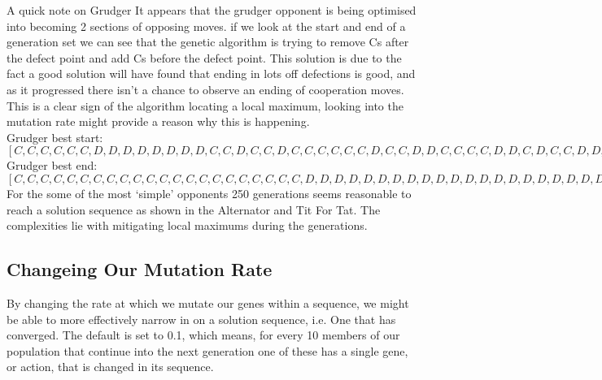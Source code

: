     A quick note on Grudger It appears that the grudger opponent is being optimised into becoming 2 sections of opposing moves. if we look at the start and end of a generation set we can see that the genetic algorithm is trying to remove Cs after the defect point and add Cs before the defect point. This solution is due to the fact a good solution will have found that ending in lots off defections is good, and as it progressed there isn't a chance to observe an ending of cooperation moves. This is a clear sign of the algorithm locating a local maximum, looking into the mutation rate might provide a reason why this is happening.\\
    
    Grudger best start:\([C, C, C, C, C, C, D, D, D, D, D, D, D, D, C, C, D, C, C, D, C, C, C, C, C, C, D, C, C, D, D, C, C, C, C, D, D, C, D, C, C, D, D, D, D, D, D, D, D, D, D, C, D, C, D, D, D, C, D, D, D, C, D, C, D, C, C, D, D, C, D, C, D, D, C, C, C, D, D, D, D, D, C, C, D, D, C, C, D, C, D, D, C, D, C, C, C, C, D, C, C, D, C, D, C, C, D, D, D, C, D, C, C, D, D, C, D, D, D, D, D, D, D, C, C, C, D, D, C, D, D, C, C, C, D, C, D, D, D, D, D, C, D, C, D, C, D, C, D, C, D, C, C, C, C, D, C, D, C, D, D, D, D, C, C, D, C, D, D, D, C, D, C, C, D, D, D, C, C, C, C, D, C, D, D, D, C, C, D, D, D, D, C, C, D, C, C, D, D, D]\)\\ 

    Grudger best end:\([C, C, C, C, C, C, C, C, C, C, C, C, C, C, C, C, C, C, C, C, C, C, D, D, D, D, D, D, D, D, D, D, D, D, D, D, D, D, D, D, D, D, D, D, D, D, D, D, D, D, D, D, D, D, D, D, D, D, D, D, D, D, D, D, D, D, D, D, D, D, D, D, D, D, D, D, D, D, D, D, D, D, D, D, D, D, D, D, D, D, D, D, D, D, D, D, D, D, D, D, D, D, D, D, D, D, D, D, D, D, D, D, D, D, D, D, D, D, D, D, D, D, D, D, D, D, D, D, D, D, D, D, D, D, D, D, D, D, D, D, D, D, D, D, D, D, D, D, D, D, D, D, D, D, D, D, D, D, D, D, D, D, D, D, D, D, D, D, D, D, D, D, D, D, D, D, D, D, D, D, D, D, D, D, D, D, D, D, D, D, D, D, D, D, D, D, D, D, D, D]\)\\
    

    For the some of the most `simple' opponents 250 generations seems reasonable to reach a solution sequence as shown in the Alternator and Tit For Tat. The complexities lie with mitigating local maximums during the generations.\\
    
    \subsection{Changeing Our Mutation Rate}
    By changing the rate at which we mutate our genes within a sequence, we might be able to more effectively narrow in on a solution sequence, i.e. One that has converged. The default is set to 0.1, which means, for every 10 members of our population that continue into the next generation one of these has a single gene, or action, that is changed in its sequence. 
    

